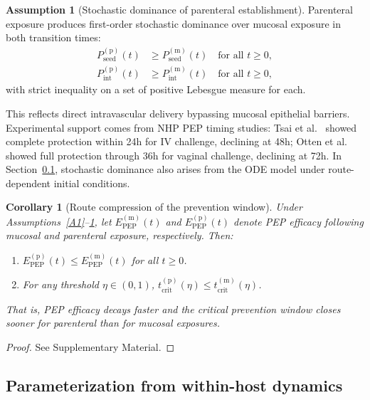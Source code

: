 \documentclass[12pt,a4paper]{article}
\theoremstyle{plain}
\newtheorem{corollary}[theorem]{Corollary}
\theoremstyle{definition}
\newtheorem{assumption}{Assumption}
\theoremstyle{remark}
\newcommand{\Pint}{P_{\mathrm{int}}}
\newcommand{\Pseed}{P_{\mathrm{seed}}}
\newcommand{\Epep}{E_{\mathrm{PEP}}}
\newcommand{\tcrit}{t_{\mathrm{crit}}}
\begin{document}
\begin{assumption}[Stochastic dominance of parenteral establishment]\label{A4}
Parenteral exposure produces first-order stochastic dominance over mucosal exposure in both transition times:
\begin{align}
    \Pseed^{(\mathrm{p})}(t) &\geq \Pseed^{(\mathrm{m})}(t) \quad \text{for all } t \geq 0, \label{eq:stoch-dom-seed}\\
    \Pint^{(\mathrm{p})}(t) &\geq \Pint^{(\mathrm{m})}(t) \quad \text{for all } t \geq 0, \label{eq:stoch-dom-int}
\end{align}
with strict inequality on a set of positive Lebesgue measure for each.
\end{assumption}

This reflects direct intravascular delivery bypassing mucosal epithelial barriers. Experimental support comes from NHP PEP timing studies: Tsai et al.\ \citep{ref:Tsai1998} showed complete protection within 24h for IV challenge, declining at 48h; Otten et al.\ \citep{ref:Otten2000} showed full protection through 36h for vaginal challenge, declining at 72h. In Section~\ref{sec:param}, stochastic dominance also arises from the ODE model under route-dependent initial conditions.

\begin{corollary}[Route compression of the prevention window]\label{cor:compression}
Under Assumptions~\ref{A1}--\ref{A4}, let $\Epep^{(\mathrm{m})}(t)$ and $\Epep^{(\mathrm{p})}(t)$ denote PEP efficacy following mucosal and parenteral exposure, respectively. Then:
\begin{enumerate}
    \item[(i)] $\Epep^{(\mathrm{p})}(t) \leq \Epep^{(\mathrm{m})}(t)$ for all $t \geq 0$.
    \item[(ii)] For any threshold $\eta \in (0,1)$, $\tcrit^{(\mathrm{p})}(\eta) \leq \tcrit^{(\mathrm{m})}(\eta)$.
\end{enumerate}
That is, PEP efficacy decays faster and the critical prevention window closes sooner for parenteral than for mucosal exposures.
\end{corollary}

\begin{proof}
See Supplementary Material.
\end{proof}



\subsection{Parameterization from within-host dynamics}\label{sec:param}
\end{document}
